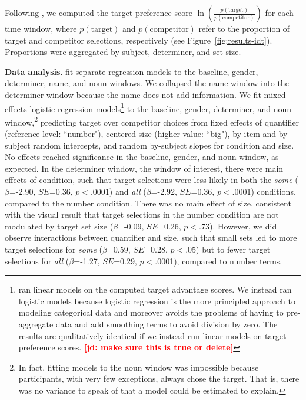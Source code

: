 \documentclass[10pt,letterpaper]{article}
\newcommand{\figref}[1]{Figure~\ref{#1}}
\newcommand{\jd}[1]{\textcolor{Red}{\textbf{[jd: #1]}}}
\begin{document}
Following , we computed the target preference score $\ln (\frac{p(\text{target})}{p(\text{competitor})})$ for each time window, where  $p(\text{target})$ and $p(\text{competitor})$ refer to the proportion of target and competitor selections, respectively (see \figref{fig:results-idt}). Proportions were aggregated by subject, determiner, and set size. 

\textbf{Data analysis}.  fit separate regression models to the baseline, gender, determiner, name, and noun windows. We collapsed the name window into the determiner window because the name does not add information. We fit mixed-effects logistic regression models\footnote{ ran linear models on the computed target advantage scores. We instead ran logistic models because logistic regression is the more principled approach to modeling categorical data and moreover avoids the problems of having to pre-aggregate data and add smoothing terms to avoid division by zero. The results are qualitatively identical if we instead run linear models on target preference scores. \jd{make sure this is true or delete}} to the baseline, gender, determiner, and noun window,\footnote{In fact, fitting models to the noun window was impossible because participants, with very few exceptions, always chose the target. That is, there was no variance to speak of that a model could be estimated to explain.} predicting target over competitor choices from fixed effects of quantifier (reference level: ``number"), centered size (higher value: ``big"), by-item and by-subject random intercepts, and random by-subject slopes for condition and size. No effects reached significance in the baseline, gender, and noun window, as expected. In the determiner window, the window of interest, there were main effects of condition, such that target selections were less likely in both the \emph{some} ($\beta$=-2.90, $SE$=0.36, $p<$.0001) and \emph{all} ($\beta$=-2.92, $SE$=0.36, $p<$.0001) conditions, compared to the number condition. There was no main effect of size, consistent with the visual result that target selections in the number condition are not modulated by  target set size ($\beta$=-0.09, $SE$=0.26, $p<$.73). However, we did observe interactions between quantifier and size, such that small sets led to more target selections for \emph{some} ($\beta$=0.59, $SE$=0.28, $p<$.05) but to fewer target selections for \emph{all} ($\beta$=-1.27, $SE$=0.29, $p<$.0001), compared to number terms. 

\end{document}
